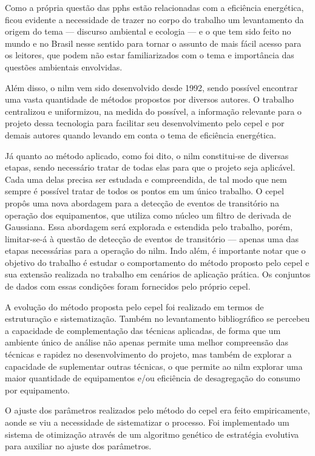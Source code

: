 Como a própria questão das \glspl{pph} estão
relacionadas com a eficiência energética, ficou evidente a necessidade
de trazer no corpo do trabalho um levantamento da origem do tema ---
discurso ambiental e ecologia --- e o que tem sido feito no mundo e no
Brasil nesse sentido para tornar o assunto de mais fácil acesso para
os leitores, que podem não estar familiarizados com o tema e
importância das questões ambientais envolvidas.

Além disso, o \acs{nilm} vem sido desenvolvido desde 1992, sendo
possível encontrar uma vasta quantidade de métodos propostos por
diversos autores. O trabalho centralizou e uniformizou, na medida do
possível, a informação relevante para o projeto dessa tecnologia para
facilitar seu desenvolvimento pelo \acs{cepel} e por demais autores
quando levando em conta o tema de eficiência energética.

Já quanto ao método aplicado, como foi dito, o \acs{nilm}
constitui-se de diversas etapas, sendo necessário tratar de todas elas
para que o projeto seja aplicável. Cada uma delas precisa ser estudada
e compreendida, de tal modo que nem sempre é possível tratar de
todos os pontos em um único trabalho. O \acs{cepel} propôs uma nova
abordagem para a detecção de eventos de transitório na operação dos
equipamentos, que utiliza como núcleo um filtro de derivada de Gaussiana.
Essa abordagem será explorada e estendida pelo trabalho, porém,
limitar-se-á à questão de detecção de eventos de transitório --- apenas
uma das etapas necessárias para a operação do \acs{nilm}. Indo além, é
importante notar que o objetivo do trabalho é estudar o comportamento
do método proposto pelo \acs{cepel} e sua extensão realizada no
trabalho em cenários de aplicação prática. Os conjuntos de dados com
essas condições foram fornecidos pelo próprio \acs{cepel}.

A evolução do método proposta pelo \acs{cepel} foi realizado em
termos de estruturação e sistematização. Também no levantamento
bibliográfico se percebeu a capacidade de complementação das técnicas
aplicadas, de forma que um ambiente único de análise não apenas
permite uma melhor compreensão das técnicas e rapidez no
desenvolvimento do projeto, mas também de explorar a capacidade de
suplementar outras técnicas, o que permite ao \gls{nilm} explorar uma
maior quantidade de equipamentos e/ou eficiência de desagregação do
consumo por equipamento.

O ajuste dos parâmetros realizados pelo método do \acs{cepel} era
feito empiricamente, aonde se viu a necessidade de sistematizar o
processo. Foi implementado um sistema de otimização através de um
algoritmo genético de estratégia evolutiva para auxiliar no ajuste dos
parâmetros.

